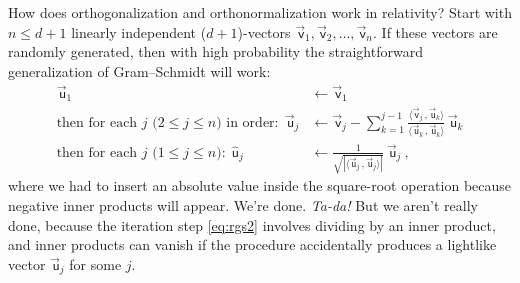 \documentclass{article}
\newcommand\upvec[1]{\!\vec{\,\mathrm{#1}}}
\newcommand{\Lvec}[1]{\upvec{\mathsf{#1}}} %
\newcommand{\Lhat}[1]{\hat{\mathsf{#1}}} %
\newcommand{\inner}[2]{\langle{#1}\,,{#2}\rangle}
\newcommand{\plus}{\!+\!} %
\begin{document}
How does orthogonalization and orthonormalization work in relativity?
Start with $n\leq d+1$ linearly independent ($d\plus1$)-vectors $\Lvec{v}_1,\Lvec{v}_2,\ldots,\Lvec{v}_n$.
If these vectors are randomly generated, then with high probability the straightforward generalization of Gram--Schmidt will work:
\begin{align}
    \Lvec{u}_1 &\leftarrow \Lvec{v}_1 \label{eq:rgs1}
    \\
    \mbox{then for each $j$ ($2\leq j\leq n$) in order:} ~~ \Lvec{u}_j &\leftarrow \Lvec{v}_j - \sum_{k=1}^{j-1} \frac{\inner{\Lvec{v}_j}{\Lvec{u}_k}}{\inner{\Lvec{u}_k}{\Lvec{u}_k}}\,\Lvec{u}_k \label{eq:rgs2}
    \\
    \mbox{then for each $j$ ($1\leq j\leq n$):} ~~ \Lhat{u}_j &\leftarrow \frac{1}{\sqrt{|\inner{\Lvec{u}_j}{\Lvec{u}_j}|}}\,\Lvec{u}_j ~, \label{eq:rgs3}
\end{align}
where we had to insert an absolute value inside the square-root operation because negative inner products will appear.
We're done. \emph{Ta-da!}
But we aren't really done, because the iteration step \eqref{eq:rgs2} involves dividing by an inner product, and inner products can vanish if the procedure accidentally produces a lightlike vector $\Lvec{u}_j$ for some $j$.
\end{document}
